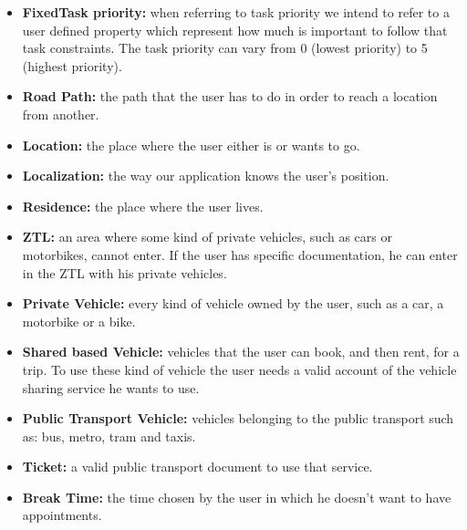 \begin{itemize}
     \item \textbf{FixedTask priority:} when referring to task priority we intend to refer to a user defined property which represent how much is important to follow that task constraints. The task priority can vary from 0 (lowest priority) to 5 (highest priority).
     
    \item \textbf{Road Path:} the path that the user has to do in order to reach a location from another.
    
    \item \textbf{Location:} the place where the user either is or wants to go.
    
    \item \textbf{Localization:} the way our application knows the user's position.
    
    \item \textbf{Residence:} the place where the user lives.
    
    \item \textbf{ZTL:} an area where some kind of private vehicles, such as cars or motorbikes, cannot enter. If the user has specific documentation, he can enter in the ZTL with his private vehicles.
    
    \item \textbf{Private Vehicle:} every kind of vehicle owned by the user, such as a car, a motorbike or a bike.
    
    \item \textbf{Shared based Vehicle:} vehicles that the user can book, and then rent, for a trip. To use these kind of vehicle the user needs a valid account of the vehicle sharing service he wants to use.
    
    \item \textbf{Public Transport Vehicle:} vehicles belonging to the public transport such as: bus, metro, tram and taxis.
        
    \item \textbf{Ticket:} a valid public transport document to use that service.
    
    \item \textbf{Break Time:} the time chosen by the user in which he doesn't want to have appointments.
    

\end{itemize}

